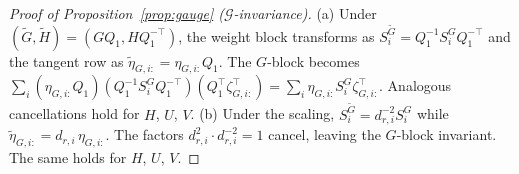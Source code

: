 \documentclass[10pt,a4paper]{amsart}
\newcommand{\cG}{\mathcal{G}}
\begin{document}
\begin{proof}[Proof of Proposition~\ref{prop:gauge} ($\cG$-invariance)]
(a) Under $(\tilde G,\tilde H) = (GQ_1, HQ_1^{-\top})$, the weight block transforms as $S_i^{\tilde G} = Q_1^{-1}S_i^G Q_1^{-\top}$ and the tangent row as $\tilde\eta_{G,i:} = \eta_{G,i:}Q_1$.
The $G$-block becomes $\sum_i (\eta_{G,i:}Q_1)(Q_1^{-1}S_i^G Q_1^{-\top})(Q_1^\top\zeta_{G,i:}^\top) = \sum_i \eta_{G,i:}S_i^G\zeta_{G,i:}^\top$.
Analogous cancellations hold for $H$, $U$, $V$.
(b) Under the scaling, $S_i^{\tilde G} = d_{r,i}^{-2} S_i^G$ while $\tilde\eta_{G,i:} = d_{r,i}\,\eta_{G,i:}$.
The factors $d_{r,i}^2 \cdot d_{r,i}^{-2} = 1$ cancel, leaving the $G$-block invariant. The same holds for $H$, $U$, $V$.
\end{proof}
\end{document}
